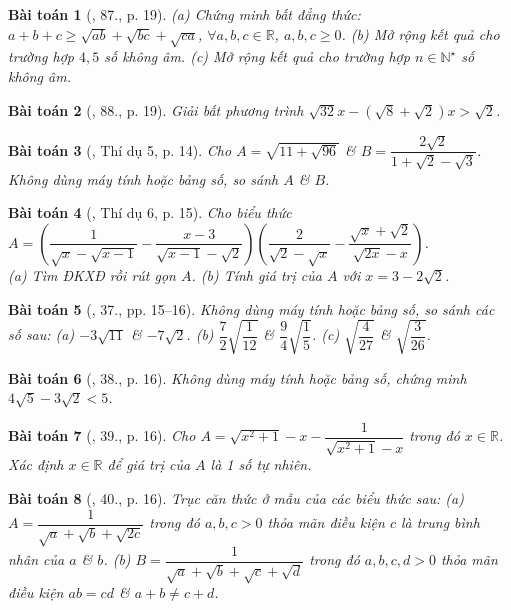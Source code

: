 \documentclass{article}
\newtheorem{baitoan}{Bài toán}
\begin{document}
\begin{baitoan}[\cite{SBT_Toan_9_tap_1}, 87., p. 19]
	(a) Chứng minh bất đẳng thức: $a + b + c\ge\sqrt{ab} + \sqrt{bc} + \sqrt{ca}$,  $\forall a,b,c\in\mathbb{R}$, $a,b,c\ge0$. (b) Mở rộng kết quả cho trường hợp $4,5$ số không âm. (c) Mở rộng kết quả cho trường hợp $n\in\mathbb{N}^\star$ số không âm.
\end{baitoan}

\begin{baitoan}[\cite{SBT_Toan_9_tap_1}, 88., p. 19]
	Giải bất phương trình $\sqrt{32}x - (\sqrt{8} + \sqrt{2})x > \sqrt{2}$.
\end{baitoan}

\begin{baitoan}[\cite{Tuyen_Toan_9}, Thí dụ 5, p. 14]
	Cho $A = \sqrt{11 + \sqrt{96}}$ \& $B = \dfrac{2\sqrt{2}}{1 + \sqrt{2} - \sqrt{3}}$. Không dùng máy tính hoặc bảng số, so sánh $A$ \& $B$.
\end{baitoan}

\begin{baitoan}[\cite{Tuyen_Toan_9}, Thí dụ 6, p. 15]
	Cho biểu thức $A = \left(\dfrac{1}{\sqrt{x} - \sqrt{x - 1}} - \dfrac{x - 3}{\sqrt{x - 1} - \sqrt{2}}\right)\left(\dfrac{2}{\sqrt{2} - \sqrt{x}} - \dfrac{\sqrt{x} + \sqrt{2}}{\sqrt{2x} - x}\right)$.\\(a) Tìm ĐKXĐ rồi rút gọn $A$. (b) Tính giá trị của $A$ với $x = 3 - 2\sqrt{2}$.
\end{baitoan}

\begin{baitoan}[\cite{Tuyen_Toan_9}, 37., pp. 15--16]
	Không dùng máy tính hoặc bảng số, so sánh các số sau: (a) $-3\sqrt{11}$ \& $-7\sqrt{2}$. (b) $\dfrac{7}{2}\sqrt{\dfrac{1}{12}}$ \& $\dfrac{9}{4}\sqrt{\dfrac{1}{5}}$. (c) $\sqrt{\dfrac{4}{27}}$ \& $\sqrt{\dfrac{3}{26}}$.
\end{baitoan}

\begin{baitoan}[\cite{Tuyen_Toan_9}, 38., p. 16]
	Không dùng máy tính hoặc bảng số, chứng minh $4\sqrt{5} - 3\sqrt{2} < 5$.
\end{baitoan}

\begin{baitoan}[\cite{Tuyen_Toan_9}, 39., p. 16]
	Cho $A = \sqrt{x^2 + 1} - x - \dfrac{1}{\sqrt{x^2 + 1} - x}$ trong đó $x\in\mathbb{R}$. Xác định $x\in\mathbb{R}$ để giá trị của $A$ là 1 số tự nhiên.
\end{baitoan}

\begin{baitoan}[\cite{Tuyen_Toan_9}, 40., p. 16]
	Trục căn thức ở mẫu của các biểu thức sau: (a) $A = \dfrac{1}{\sqrt{a} + \sqrt{b} + \sqrt{2c}}$ trong đó $a,b,c > 0$ thỏa mãn điều kiện $c$ là trung bình nhân của $a$ \& $b$. (b) $B = \dfrac{1}{\sqrt{a} + \sqrt{b} + \sqrt{c} + \sqrt{d}}$ trong đó $a,b,c,d > 0$ thỏa mãn điều kiện $ab = cd$ \& $a + b\ne c + d$.
\end{baitoan}
\end{document}
